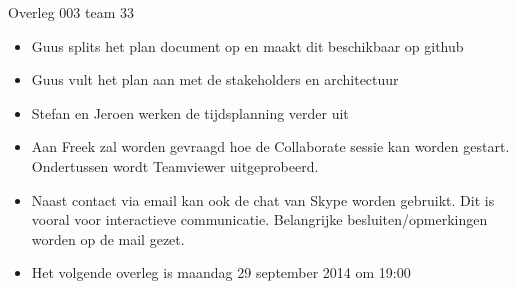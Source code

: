 \documentclass{article}
\begin{document}
\begin{Minutes}{Overleg 003 team 33}

\begin{itemize}
 \item Guus splits het plan document op en maakt dit beschikbaar op github
 \item Guus vult het plan aan met de stakeholders en architectuur
 \item Stefan en Jeroen werken de tijdsplanning verder uit
 \item Aan Freek zal worden gevraagd hoe de Collaborate sessie kan worden gestart. Ondertussen wordt Teamviewer uitgeprobeerd.
 \item Naast contact via email kan ook de chat van Skype worden gebruikt. Dit is vooral voor interactieve communicatie. Belangrijke besluiten/opmerkingen worden op de mail gezet.
 \item Het volgende overleg is maandag 29 september 2014 om 19:00
\end{itemize}


\end{Minutes}
\end{document}
